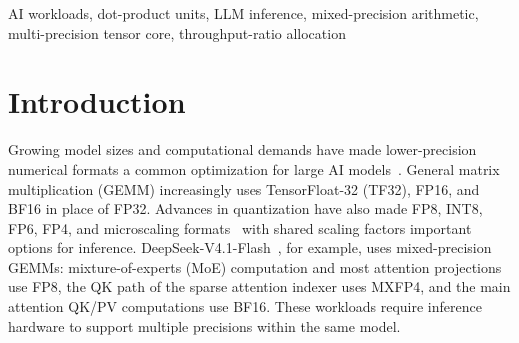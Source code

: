 \documentclass[conference,10pt,letterpaper]{IEEEtran}
\title{\PaperTitle}
\author{\IEEEauthorblockN{Anonymous Submission}}
\begin{document}
\maketitle

\suppressfloats[t]


\begin{abstract}
Mixed-precision AI workloads make tensor-core throughput allocation across 16/8/4-bit formats a key design choice. DP-Puzzle combines shared multi-precision datapaths with precision-specific compute units to tune throughput allocation; we compare nine configurations, jointly modeling area, power, and precision migration. At 12 nm and 1 GHz, doubling FP4 throughput raises area by 33.6\% while improving area and energy efficiency by 49.7\% and 27.3\%. At matched area and power, 1:2:8 performs best overall among the nine, yielding a modeled $1.13\times$ compute-only speedup on DeepSeek-V4.1-Flash GEMMs. Moderate expansion thus balances low-precision capacity and deployment density.
\end{abstract}
\begin{IEEEkeywords}
AI workloads, dot-product units, LLM inference, mixed-precision arithmetic, multi-precision tensor core, throughput-ratio allocation
\end{IEEEkeywords}

\section{Introduction}
\label{sec:introduction}
Growing model sizes and computational demands have made lower-precision numerical formats a common optimization for large AI models~\cite{deepseekv3}. General matrix multiplication (GEMM) increasingly uses TensorFloat-32 (TF32), FP16, and BF16 in place of FP32. Advances in quantization have also made FP8, INT8, FP6, FP4, and microscaling formats~\cite{ocpmx2023} with shared scaling factors important options for inference. DeepSeek-V4.1-Flash~\cite{deepseekv41source}, for example, uses mixed-precision GEMMs: mixture-of-experts (MoE) computation and most attention projections use FP8, the QK path of the sparse attention indexer uses MXFP4, and the main attention QK/PV computations use BF16. These workloads require inference hardware to support multiple precisions within the same model.
\end{document}

